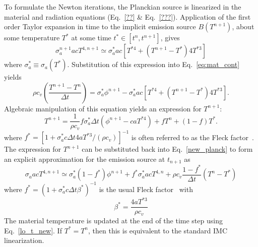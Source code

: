To formulate the Newton iterations, the Planckian source is linearized in the material and radiation equations (Eq.~\eqref{??}
\& Eq.~\eqref{???}). Application of the first order Taylor expansion in time to the
implicit emission source $B(T^{n+1})$, about some temperature $T^*$ at some
time $t^*\in[t^{n},t^{n+1}]$, gives
\begin{equation}\label{new_planck}
    \sigma_a^{n+1} a c T^{4,n+1} \simeq \sigma_a^* a c \left[T^{*4} + (T^{n+1} - T^*) 4T^{*3} \right]
\end{equation}
where $\sigma_a^*\equiv\sigma_a(T^*)$.  Substitution of this expression into Eq.~\eqref{eq:mat_cont} yields
\begin{equation}
    \rho c_v \left( \frac{T^{n+1} - T^{n}}{\Delta t} \right) = \sigma_a^* \phi^{n+1} -
    \sigma_a^* a c \left[ T^{*4} +  (T^{n+1} - T^*) 4T^{*3} \right].
\end{equation}
Algebraic manipulation of this equation yields an expression for $T^{n+1}$:
\begin{equation}
\label{lo_t_new}
T^{n+1}  = \frac{1}{\rho c_v } f\sigma_a^* \Delta t \left( \phi^{n+1} - c a T^{*4} \right)
+ f T^n + (1-f) T^*.
\end{equation}
where $f^* = [1 + \sigma_a^* c \Delta t 4 a T^{*3}/(\rho c_v)]^{-1}$ is often referred to
as the Fleck factor~\cite{fnc}. The
expression for $T^{n+1}$ can be substituted back into Eq.~\eqref{new_planck} to form
an explicit approximation for the emission source at $t_{n+1}$ as
\begin{equation}\label{t_next1}
    \sigma_a a c T^{4,n+1} \simeq \sigma_a^* (1 -f^*) \phi^{n+1}
    + f^* \sigma_a^* a c T^{4,n} + \rho c_v\frac{1-f^*}{\Delta t} (T^n - T^*)
\end{equation}
where $f^* = (1 + \sigma_a^* c \Delta t \beta^*)^{-1}$ is the usual Fleck
factor~\cite{fnc} with
\begin{equation}
    \beta^* = \frac{4 a T^{*3}}{\rho c_v}
\end{equation}
The material temperature is updated at the end of the time step using Eq.~\ref{lo_t_new}.
 If $T^*=T^n$, then this is equivalent to the standard IMC linearization.  

